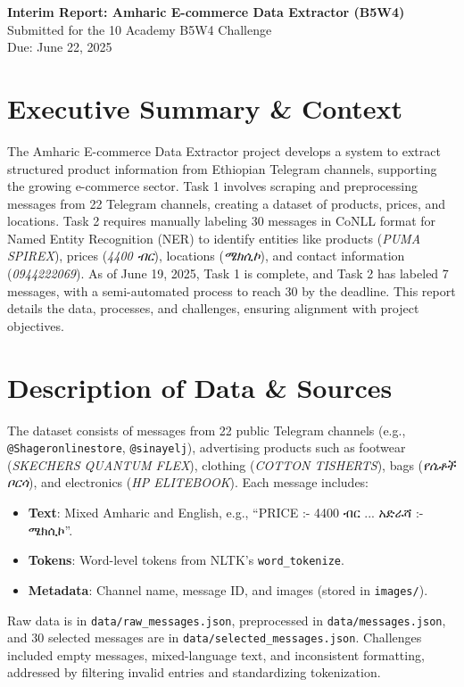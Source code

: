 \documentclass[11pt]{article}
\begin{document}
\begin{center}
    \textbf{\large Interim Report: Amharic E-commerce Data Extractor (B5W4)}\\
    \vspace{0.2cm}
    \small Submitted for the 10 Academy B5W4 Challenge\\
    \small Due: June 22, 2025
\end{center}

\vspace{0.3cm}

\section*{Executive Summary \& Context}
The Amharic E-commerce Data Extractor project develops a system to extract structured product information from Ethiopian Telegram channels, supporting the growing e-commerce sector. Task 1 involves scraping and preprocessing messages from 22 Telegram channels, creating a dataset of products, prices, and locations. Task 2 requires manually labeling 30 messages in CoNLL format for Named Entity Recognition (NER) to identify entities like products (\textit{PUMA SPIREX}), prices (\textit{4400 ብር}), locations (\textit{ሜክሲኮ}), and contact information (\textit{0944222069}). As of June 19, 2025, Task 1 is complete, and Task 2 has labeled 7 messages, with a semi-automated process to reach 30 by the deadline. This report details the data, processes, and challenges, ensuring alignment with project objectives.

\section*{Description of Data \& Sources}
The dataset consists of messages from 22 public Telegram channels (e.g., \texttt{@Shageronlinestore}, \texttt{@sinayelj}), advertising products such as footwear (\textit{SKECHERS QUANTUM FLEX}), clothing (\textit{COTTON TISHERTS}), bags (\textit{የሴቶች ቦርሳ}), and electronics (\textit{HP ELITEBOOK}). Each message includes:
\begin{itemize}
    \item \textbf{Text}: Mixed Amharic and English, e.g., ``PRICE :- 4400 ብር ... አድራሻ :- ሜክሲኮ''.
    \item \textbf{Tokens}: Word-level tokens from NLTK's \texttt{word\_tokenize}.
    \item \textbf{Metadata}: Channel name, message ID, and images (stored in \texttt{images/}).
\end{itemize}
Raw data is in \texttt{data/raw\_messages.json}, preprocessed in \texttt{data/messages.json}, and 30 selected messages are in \texttt{data/selected\_messages.json}. Challenges included empty messages, mixed-language text, and inconsistent formatting, addressed by filtering invalid entries and standardizing tokenization.
\end{document}
